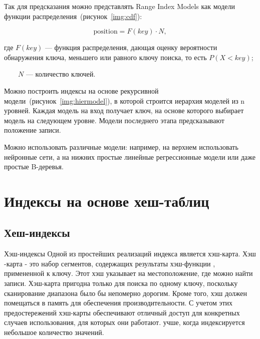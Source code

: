 
Так для предсказания можно представлять Range Index Models как модели функции
распределения~(рисунок~\ref{img:cdf}):

\begin{equation}
    \text{position} = F(key) \cdot N,
\end{equation}

где $F(key)$ --- функция распределения, дающая оценку вероятности обнаружения
ключа, меньшего или равного ключу поиска, то есть $P(X < key)$;

~~~~$N$ --- количество ключей.


Можно построить индексы на основе рекурсивной
модели~(рисунок~\ref{img:hiermodel}), в которой строится иерархия моделей из n
уровней. Каждая модель на вход получает ключ, на основе которого выбирает модель
на следующем уровне. Модели последнего этапа предсказывают положение записи.


Можно использовать различные модели: например, на верхнем использовать нейронные
сети, а на нижних простые линейные регрессионные модели или даже простые
B-деревья.

\section{Индексы на основе хеш-таблиц}

\subsection{Хеш-индексы}


Хэш-индексы
Одной из простейших реализаций индекса является хэш-карта. Хэш -карта - это
набор сегментов, содержащих результаты хэш-функции , примененной к ключу. Этот
хэш указывает на местоположение, где можно найти записи. Хэш-карта пригодна
только для поиска по одному ключу, поскольку сканирование диапазона было бы
непомерно дорогим. Кроме того, хэш должен помещаться в память для обеспечения
производительности. С учетом этих предостережений хэш-карты обеспечивают
отличный доступ для конкретных случаев использования, для которых они работают.
учше, когда индексируется небольшое количество значений.


